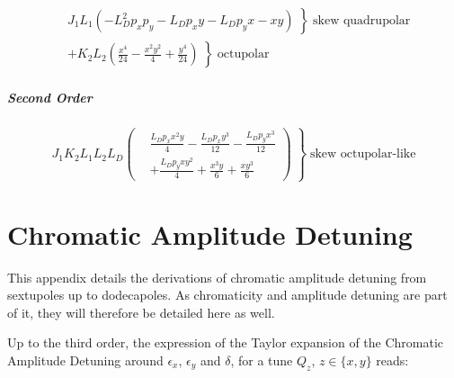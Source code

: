 \begin{equation}
  \begin{aligned}
    &\left. J_{1} L_{1} \left(- L_{D}^{2} p_{x} p_{y} - L_{D} p_{x} y - L_{D} p_{y} x - x y\right) \; \right\} \; \text{skew quadrupolar}\\
    &\left. + K_{2} L_{2} \left(\frac{x^{4}}{24} - \frac{x^{2} y^{2}}{4} + \frac{y^{4}}{24}\right) \; \right\} \; \text{octupolar}
  \end{aligned}
\end{equation}


\paragraph{Second Order}

\begin{equation}
  \left. J_{1} K_{2} L_{1} L_{2} L_{D} \left(
  \begin{aligned}
      &\frac{L_{D} p_{x} x^{2} y}{4} - \frac{L_{D} p_{x} y^{3}}{12} - \frac{L_{D} p_{y} x^{3}}{12} \\
      &+ \frac{L_{D} p_{y} x y^{2}}{4} + \frac{x^{3} y}{6} + \frac{x y^{3}}{6}
  \end{aligned}
  \right) \; \right\} \; \text{skew octupolar-like}
\end{equation}




\chapter{Chromatic Amplitude Detuning}
\label{appendix:chromatic_amplitude_detuning}

This appendix details the derivations of chromatic amplitude detuning from sextupoles up to
dodecapoles. As chromaticity and amplitude detuning are part of it, they will therefore be detailed
here as well.

\newpage
Up to the third order, the expression of the Taylor expansion of the Chromatic Amplitude Detuning
around $\epsilon_x$, $\epsilon_y$ and $\delta$, for a tune $Q_z$, $z \in \{x, y\}$ reads:

